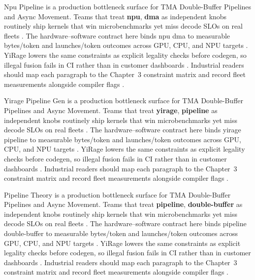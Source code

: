 Npu Pipeline is a production bottleneck surface for TMA Double-Buffer Pipelines and Async Movement. Teams that treat \textbf{npu}, \textbf{dma} as independent knobs routinely ship kernels that win microbenchmarks yet miss decode SLOs on real fleets \citep{nvidia2024cudagraphs,taxbreak2026}. The hardware--software contract here binds npu dma to measurable bytes/token and launches/token outcomes across GPU, CPU, and NPU targets \citep{liu2024deepseekv3,memoryfloor2026}. YiRage lowers the same constraints as explicit legality checks before codegen, so illegal fusion fails in CI rather than in customer dashboards \citep{patel2025llminference,nvidia2022hopper}. Industrial readers should map each paragraph to the Chapter~3 constraint matrix and record fleet measurements alongside compiler flags \citep{taxbreak2026,semianalysis2024tma}.

Yirage Pipeline Gen is a production bottleneck surface for TMA Double-Buffer Pipelines and Async Movement. Teams that treat \textbf{yirage}, \textbf{pipeline} as independent knobs routinely ship kernels that win microbenchmarks yet miss decode SLOs on real fleets \citep{liu2024deepseekv3,memoryfloor2026}. The hardware--software contract here binds yirage pipeline to measurable bytes/token and launches/token outcomes across GPU, CPU, and NPU targets \citep{patel2025llminference,nvidia2022hopper}. YiRage lowers the same constraints as explicit legality checks before codegen, so illegal fusion fails in CI rather than in customer dashboards \citep{taxbreak2026,semianalysis2024tma}. Industrial readers should map each paragraph to the Chapter~3 constraint matrix and record fleet measurements alongside compiler flags \citep{memoryfloor2026,amd2024xdna}.

Pipeline Theory is a production bottleneck surface for TMA Double-Buffer Pipelines and Async Movement. Teams that treat \textbf{pipeline}, \textbf{double-buffer} as independent knobs routinely ship kernels that win microbenchmarks yet miss decode SLOs on real fleets \citep{patel2025llminference,nvidia2022hopper}. The hardware--software contract here binds pipeline double-buffer to measurable bytes/token and launches/token outcomes across GPU, CPU, and NPU targets \citep{taxbreak2026,semianalysis2024tma}. YiRage lowers the same constraints as explicit legality checks before codegen, so illegal fusion fails in CI rather than in customer dashboards \citep{memoryfloor2026,amd2024xdna}. Industrial readers should map each paragraph to the Chapter~3 constraint matrix and record fleet measurements alongside compiler flags \citep{nvidia2022hopper,amd2024aie}.


